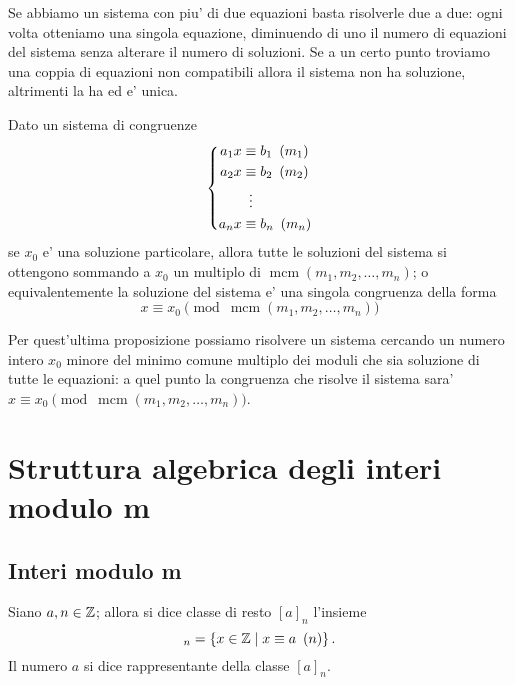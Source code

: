 Se abbiamo un sistema con piu' di due equazioni basta risolverle due a due: ogni volta otteniamo una singola equazione, diminuendo di uno il numero di equazioni del sistema senza alterare il numero di soluzioni. Se a un certo punto troviamo una coppia di equazioni non compatibili allora il sistema non ha soluzione, altrimenti la ha ed e' unica.

\begin{proposition}
    Dato un sistema di congruenze 
    \begin{equation*}
        \left\{
        \begin{alignedat}{1}
            a_1x &\equiv b_1 \Mod{m_1}\\
            a_2x &\equiv b_2 \Mod{m_2}\\
            &\vdotswithin{\equiv} \\
            a_nx &\equiv b_n \Mod{m_n}
        \end{alignedat}      
        \right . 
    \end{equation*}
    se $x_0$ e' una soluzione particolare, allora tutte le soluzioni del sistema si ottengono sommando a $x_0$ un multiplo di $\operatorname{mcm}(m_1, m_2, \dots, m_n)$; o equivalentemente la soluzione del sistema e' una singola congruenza della forma
    \begin{equation}
        x \equiv x_0 \pmod{\operatorname{mcm}(m_1, m_2, \dots, m_n)}
    \end{equation}
\end{proposition}

Per quest'ultima proposizione possiamo risolvere un sistema cercando un numero intero $x_0$ minore del minimo comune multiplo dei moduli che sia soluzione di tutte le equazioni: a quel punto la congruenza che risolve il sistema sara' $x \equiv x_0 \pmod{\operatorname{mcm}(m_1, m_2, \dots, m_n)}$.

\section{Struttura algebrica degli interi modulo m}

\subsection{Interi modulo m}

\begin{definition}
    Siano $a, n \in \mathbb{Z}$; allora si dice classe di resto $[a]_n$ l'insieme 
    \begin{equation}
        [a]_n = \left\{x \in \Z \mid x \equiv a \Mod{n}\right\}.
    \end{equation}
    Il numero $a$ si dice rappresentante della classe $[a]_n$.
\end{definition}

